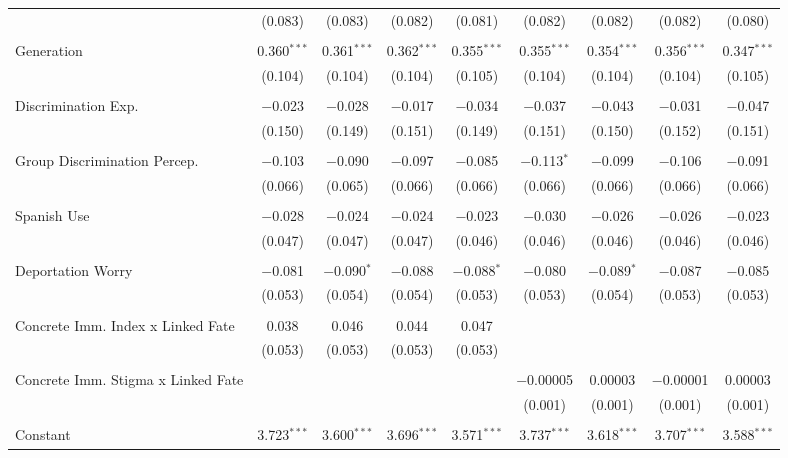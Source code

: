 \begin{table}[!htbp]
\begin{tabular}{@{\extracolsep{5pt}}lcccccccc}
  & (0.083) & (0.083) & (0.082) & (0.081) & (0.082) & (0.082) & (0.082) & (0.080) \\ 
  & & & & & & & & \\ 
 Generation & 0.360$^{***}$ & 0.361$^{***}$ & 0.362$^{***}$ & 0.355$^{***}$ & 0.355$^{***}$ & 0.354$^{***}$ & 0.356$^{***}$ & 0.347$^{***}$ \\ 
  & (0.104) & (0.104) & (0.104) & (0.105) & (0.104) & (0.104) & (0.104) & (0.105) \\ 
  & & & & & & & & \\ 
 Discrimination Exp. & $-$0.023 & $-$0.028 & $-$0.017 & $-$0.034 & $-$0.037 & $-$0.043 & $-$0.031 & $-$0.047 \\ 
  & (0.150) & (0.149) & (0.151) & (0.149) & (0.151) & (0.150) & (0.152) & (0.151) \\ 
  & & & & & & & & \\ 
 Group Discrimination Percep. & $-$0.103 & $-$0.090 & $-$0.097 & $-$0.085 & $-$0.113$^{*}$ & $-$0.099 & $-$0.106 & $-$0.091 \\ 
  & (0.066) & (0.065) & (0.066) & (0.066) & (0.066) & (0.066) & (0.066) & (0.066) \\ 
  & & & & & & & & \\ 
 Spanish Use & $-$0.028 & $-$0.024 & $-$0.024 & $-$0.023 & $-$0.030 & $-$0.026 & $-$0.026 & $-$0.023 \\ 
  & (0.047) & (0.047) & (0.047) & (0.046) & (0.046) & (0.046) & (0.046) & (0.046) \\ 
  & & & & & & & & \\ 
 Deportation Worry & $-$0.081 & $-$0.090$^{*}$ & $-$0.088 & $-$0.088$^{*}$ & $-$0.080 & $-$0.089$^{*}$ & $-$0.087 & $-$0.085 \\ 
  & (0.053) & (0.054) & (0.054) & (0.053) & (0.053) & (0.054) & (0.053) & (0.053) \\ 
  & & & & & & & & \\ 
 Concrete Imm. Index x Linked Fate & 0.038 & 0.046 & 0.044 & 0.047 &  &  &  &  \\ 
  & (0.053) & (0.053) & (0.053) & (0.053) &  &  &  &  \\ 
  & & & & & & & & \\ 
 Concrete Imm. Stigma x Linked Fate &  &  &  &  & $-$0.00005 & 0.00003 & $-$0.00001 & 0.00003 \\ 
  &  &  &  &  & (0.001) & (0.001) & (0.001) & (0.001) \\ 
  & & & & & & & & \\ 
 Constant & 3.723$^{***}$ & 3.600$^{***}$ & 3.696$^{***}$ & 3.571$^{***}$ & 3.737$^{***}$ & 3.618$^{***}$ & 3.707$^{***}$ & 3.588$^{***}$ \\ 

\end{tabular}
\end{table}
